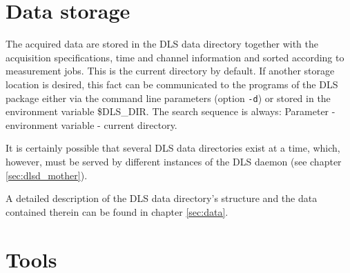 \documentclass[a4paper,12pt,BCOR6mm,bibtotoc,idxtotoc]{scrbook}
\begin{document}

\section{Data storage} \label{sec:allg_ablage}

The acquired data are stored in the DLS data directory together with the acquisition specifications, time and channel information and sorted according to measurement jobs. This is the current directory by default. If another storage location is desired, this fact can be communicated to the programs of the DLS package either via the command line parameters (option \texttt{-d}) or stored in the environment variable \$DLS\_DIR. The search sequence is always: Parameter - environment variable - current directory.

It is certainly possible that several DLS data directories exist at a time, which, however, must be served by different instances of the DLS daemon (see chapter \ref{sec:dlsd_mother}).

A detailed description of the DLS data directory’s structure and the data contained therein can be found in chapter \ref{sec:data}.


\section{Tools} \label{sec:allg_tools} 
\end{document}
